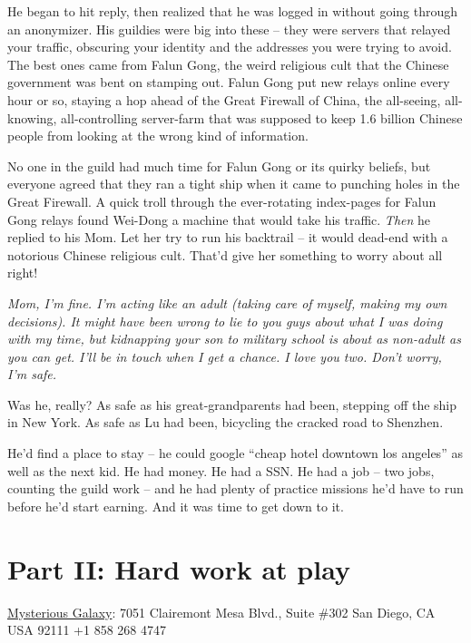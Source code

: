 He began to hit reply, then realized that he was logged in without
going through an anonymizer. His guildies were big into these --
they were servers that relayed your traffic, obscuring your
identity and the addresses you were trying to avoid. The best ones
came from Falun Gong, the weird religious cult that the Chinese
government was bent on stamping out. Falun Gong put new relays
online every hour or so, staying a hop ahead of the Great Firewall
of China, the all-seeing, all-knowing, all-controlling server-farm
that was supposed to keep 1.6 billion Chinese people from looking
at the wrong kind of information.

No one in the guild had much time for Falun Gong or its quirky
beliefs, but everyone agreed that they ran a tight ship when it
came to punching holes in the Great Firewall. A quick troll through
the ever-rotating index-pages for Falun Gong relays found Wei-Dong
a machine that would take his traffic. \emph{Then} he replied to
his Mom. Let her try to run his backtrail -- it would dead-end with
a notorious Chinese religious cult. That'd give her something to
worry about all right!

\emph{Mom, I'm fine. I'm acting like an adult (taking care of myself, making my own decisions). It might have been wrong to lie to you guys about what I was doing with my time, but kidnapping your son to military school is about as non-adult as you can get. I'll be in touch when I get a chance. I love you two. Don't worry, I'm safe.}

Was he, really? As safe as his great-grandparents had been,
stepping off the ship in New York. As safe as Lu had been,
bicycling the cracked road to Shenzhen.

He'd find a place to stay -- he could google ``cheap hotel downtown
los angeles'' as well as the next kid. He had money. He had a SSN.
He had a job -- two jobs, counting the guild work -- and he had
plenty of practice missions he'd have to run before he'd start
earning. And it was time to get down to it.

\chapter*{Part II: Hard work at play}

{\href{http://www.mystgalaxy.com/book/9780765322166}{Mysterious Galaxy}: 7051 Clairemont Mesa Blvd., Suite \#302 San Diego, CA USA 92111 +1 858 268 4747}

